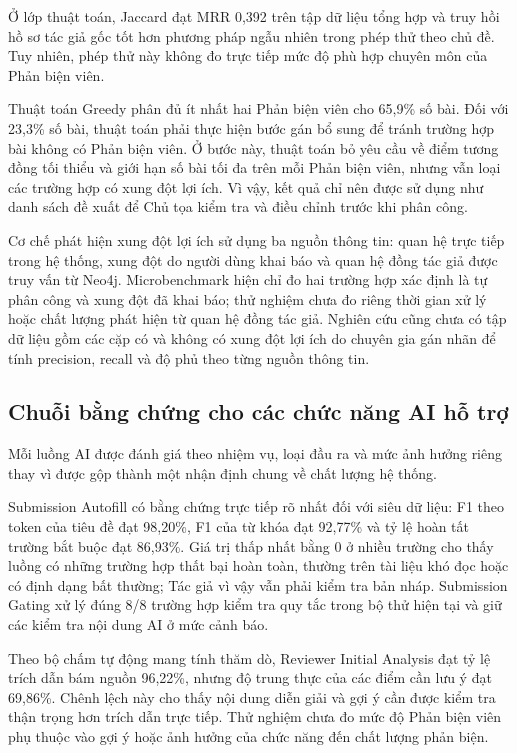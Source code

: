 Ở lớp thuật toán, Jaccard đạt MRR 0,392 trên tập dữ liệu tổng hợp và truy hồi hồ sơ tác giả gốc tốt hơn phương pháp ngẫu nhiên trong phép thử theo chủ đề. Tuy nhiên, phép thử này không đo trực tiếp mức độ phù hợp chuyên môn của Phản biện viên.

Thuật toán Greedy phân đủ ít nhất hai Phản biện viên cho 65,9\% số bài. Đối với 23,3\% số bài, thuật toán phải thực hiện bước gán bổ sung để tránh trường hợp bài không có Phản biện viên. Ở bước này, thuật toán bỏ yêu cầu về điểm tương đồng tối thiểu và giới hạn số bài tối đa trên mỗi Phản biện viên, nhưng vẫn loại các trường hợp có xung đột lợi ích. Vì vậy, kết quả chỉ nên được sử dụng như danh sách đề xuất để Chủ tọa kiểm tra và điều chỉnh trước khi phân công.

Cơ chế phát hiện xung đột lợi ích sử dụng ba nguồn thông tin: quan hệ trực tiếp trong hệ thống, xung đột do người dùng khai báo và quan hệ đồng tác giả được truy vấn từ Neo4j. Microbenchmark hiện chỉ đo hai trường hợp xác định là tự phân công và xung đột đã khai báo; thử nghiệm chưa đo riêng thời gian xử lý hoặc chất lượng phát hiện từ quan hệ đồng tác giả. Nghiên cứu cũng chưa có tập dữ liệu gồm các cặp có và không có xung đột lợi ích do chuyên gia gán nhãn để tính precision, recall và độ phủ theo từng nguồn thông tin.

\subsection{Chuỗi bằng chứng cho các chức năng AI hỗ trợ}

Mỗi luồng AI được đánh giá theo nhiệm vụ, loại đầu ra và mức ảnh hưởng riêng thay vì được gộp thành một nhận định chung về chất lượng hệ thống.

Submission Autofill có bằng chứng trực tiếp rõ nhất đối với siêu dữ liệu: F1 theo token của tiêu đề đạt 98,20\%, F1 của từ khóa đạt 92,77\% và tỷ lệ hoàn tất trường bắt buộc đạt 86,93\%. Giá trị thấp nhất bằng 0 ở nhiều trường cho thấy luồng có những trường hợp thất bại hoàn toàn, thường trên tài liệu khó đọc hoặc có định dạng bất thường; Tác giả vì vậy vẫn phải kiểm tra bản nháp. Submission Gating xử lý đúng 8/8 trường hợp kiểm tra quy tắc trong bộ thử hiện tại và giữ các kiểm tra nội dung AI ở mức cảnh báo.

Theo bộ chấm tự động mang tính thăm dò, Reviewer Initial Analysis đạt tỷ lệ trích dẫn bám nguồn 96,22\%, nhưng độ trung thực của các điểm cần lưu ý đạt 69,86\%. Chênh lệch này cho thấy nội dung diễn giải và gợi ý cần được kiểm tra thận trọng hơn trích dẫn trực tiếp. Thử nghiệm chưa đo mức độ Phản biện viên phụ thuộc vào gợi ý hoặc ảnh hưởng của chức năng đến chất lượng phản biện.

